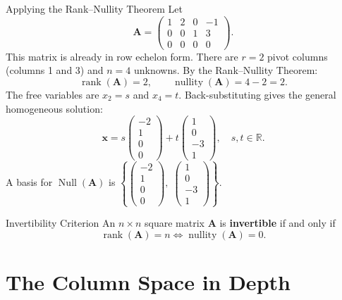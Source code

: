 \documentclass[12pt,a4paper]{article}
\newcommand{\R}{\mathbb{R}}
\newcommand{\vv}[1]{\mathbf{#1}}
\newcommand{\rank}{\operatorname{rank}}
\newcommand{\nullity}{\operatorname{nullity}}
\newcommand{\Null}{\operatorname{Null}}
\newcommand{\mat}[1]{\mathbf{#1}}
\begin{document}
	\begin{exbox}{Applying the Rank--Nullity Theorem}{}
		Let
		\[
		\mat{A} =
		\begin{pmatrix}
			1 & 2 & 0 & -1 \\
			0 & 0 & 1 &  3 \\
			0 & 0 & 0 &  0
		\end{pmatrix}.
		\]
		This matrix is already in row echelon form.  There are \(r = 2\) pivot columns
		(columns 1 and 3) and \(n = 4\) unknowns.  By the Rank--Nullity Theorem:
		\[
		\rank(\mat{A}) = 2, \qquad
		\nullity(\mat{A}) = 4 - 2 = 2.
		\]
		The free variables are \(x_2 = s\) and \(x_4 = t\).  Back-substituting gives the
		general homogeneous solution:
		\[
		\vv{x} = s\begin{pmatrix}-2\\1\\0\\0\end{pmatrix}
		+ t\begin{pmatrix}1\\0\\-3\\1\end{pmatrix}, \quad s,t \in \R.
		\]
		A basis for \(\Null(\mat{A})\) is
		\(\left\{\begin{pmatrix}-2\\1\\0\\0\end{pmatrix},\;\begin{pmatrix}1\\0\\-3\\1\end{pmatrix}\right\}\).
	\end{exbox}
	
	\begin{corbox}{Invertibility Criterion}{}
		An \(n \times n\) square matrix \(\mat{A}\) is \textbf{invertible} if and only if
		\[
		\rank(\mat{A}) = n \iff \nullity(\mat{A}) = 0.
		\]
	\end{corbox}
	
	\section{The Column Space in Depth}
	
\end{document}
